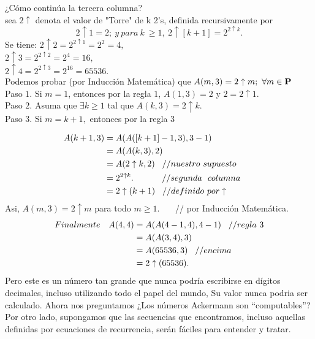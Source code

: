 \documentclass[11pt,a4paper]{article}
\begin{document}
¿Cómo continúa la tercera columna?\\
sea $2\uparrow$ denota el valor de "Torre" de k 2's, definida recursivamente por 
$$2\uparrow 1= 2;~ y~ para~ k ~\geq 1,~ 2\uparrow [k+1]= 2^{2\uparrow k}.$$
Se tiene: \hspace{3,1cm} $2 \uparrow 2 = 2^{2 \uparrow 1} = 2^{2} = 4,$\\
\hspace*{4,65cm}$2 \uparrow 3 = 2^{2 \uparrow 2} = 2^{4} = 16,$\\
\hspace*{4,65cm}$2 \uparrow 4 = 2^{2 \uparrow 3} = 2^{16} = 65536.$\\

Podemos probar (por Inducción Matemática) que $A(m,3) = 2 \uparrow m;  ~ \forall m \in \bf{P}$ \\

Paso $1$. Si $m = 1$, entonces por la regla $1$, $A(1,3) = 2$ y $2 = 2\uparrow 1.$\\
Paso $2$. Asuma que $\exists k \geq 1$ tal que $A(k,3) = 2 \uparrow k.$\\
Paso $3$. Si $m = k+1,$ entonces por la regla 3 

\begin{align*}
					A(k+1,3)    &= A(A([k+1]-1,3),3-1)\\
							    &= A(A(k,3),2)\\
							    &= A(2 \uparrow k,2) \hspace*{0.3cm} //nuestro ~supuesto\\
							    &= 2^{2 \uparrow k}.~~~~~~~~~~// segunda ~~columna \hspace*{0.6cm}\\
							    &= 2 \uparrow(k+1) \hspace{0.3cm}// definido ~por \uparrow\\
\end{align*}
Asi, $A(m,3) = 2 \uparrow m$ para todo $m \geq 1$.~~~ // por Inducción Matemática.\\
\begin{align*}				    
Finalmente ~~~	A(4,4)  &= A(A(4-1,4),4-1) \hspace*{0.3cm} //regla~3\\
							    &= A(A(3,4),3)\\
							    &= A(65536,3) \hspace*{0.3cm} //encima\\
							    &= 2 \uparrow (65536).\\						    
\end{align*}
Pero este es un número tan grande que nunca podría escribirse en dígitos decimales, incluso utilizando todo el papel del mundo, Su valor nunca podria ser calculado. Ahora nos preguntamos ¿Los números Ackermann son “computables”? Por otro lado, supongamos que las secuencias que encontramos, incluso aquellas definidas por ecuaciones de recurrencia, serán fáciles para entender y tratar.\\
\end{document}
